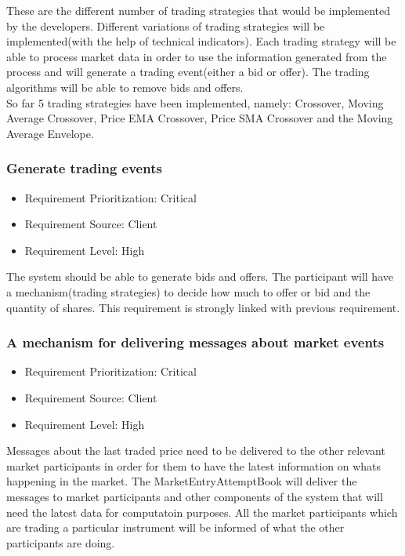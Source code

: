 \documentclass[12pt]{article}
\begin{document}
				These are the different number of trading strategies that would be implemented by the developers. Different variations of trading strategies will be implemented(with the help of technical indicators). Each trading strategy will be able to process market data in order to use the information generated from the process and will generate a trading event(either a bid or offer). The trading algorithms will be able to remove bids and offers.\\
				
				So far 5 trading strategies have been implemented, namely: Crossover, Moving Average Crossover, Price EMA Crossover, Price SMA Crossover and the Moving Average Envelope. 
				\subsubsection{Generate trading events }
				\begin{itemize}
					\item Requirement Prioritization: Critical
					\item Requirement Source: Client 	
					\item Requirement Level: High
				\end{itemize}  
				
				The system should be able to generate bids and offers. The participant will have a mechanism(trading strategies) to decide how much to offer or bid and the quantity of shares. This requirement is strongly linked with previous requirement.	 
				
			\subsubsection{A mechanism for delivering messages about market events}
			\begin{itemize}
					\item Requirement Prioritization: Critical
					\item Requirement Source: Client 
					\item Requirement Level: High	
			\end{itemize}
			
			Messages about the last traded price need to be delivered to the other relevant market participants in order for them to have the latest information on whats happening in the market. The MarketEntryAttemptBook will deliver the messages to market participants and other components of the system that will need the latest data for computatoin purposes. All the market participants which are trading a particular instrument will be informed of what the other participants are doing.
			
\end{document}

